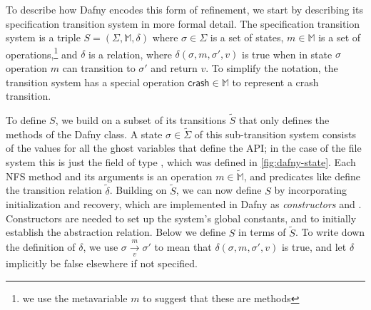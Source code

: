 \newcommand{\Op}{\mathbb{M}}

To describe how Dafny encodes this form of refinement, we start by describing its
specification transition system in more formal detail. The specification
transition system is
a triple $S = (\Sigma, \Op, \delta)$ where $\sigma \in \Sigma$ is a set of states,
$m \in \Op$ is a set of operations,\footnote{we use the metavariable $m$ to
suggest that these are methods} and $\delta$ is a relation, where
$\delta(\sigma, m, \sigma', v)$ is true when in state $\sigma$ operation $m$ can
transition to $\sigma'$ and return $v$. To simplify the notation, the transition
system has a special operation $\mathsf{crash} \in \Op$ to represent a crash transition.

\newcommand{\altsys}[1]{\tilde{#1}}

To define $S$, we build on a subset of its transitions $\altsys{S}$ that only
defines the methods of the Dafny class.
A state $\sigma \in \altsys{\Sigma}$ of this sub-transition system
consists of the values for all the ghost variables that define the API; in the
case of the file system this is just the  field of type
, which was defined in \cref{fig:dafny-state}. Each NFS method and its
arguments is an operation $m \in \altsys{\Op}$, and predicates like 
define the transition relation $\altsys{\delta}$. Building on $\altsys{S}$, we
can now define $S$ by incorporating
initialization and recovery, which are implemented
in Dafny as \emph{constructors}  and . Constructors are
needed to set up the system's global constants, and to initially establish the
abstraction relation. Below we define $S$ in terms of $\altsys{S}$.
To write down the definition of $\delta$, we use $\sigma \xrightarrow[v]{m} \sigma'$ to mean that
$\delta(\sigma, m, \sigma', v)$ is true, and let $\delta$ implicitly be false
elsewhere if not specified.

